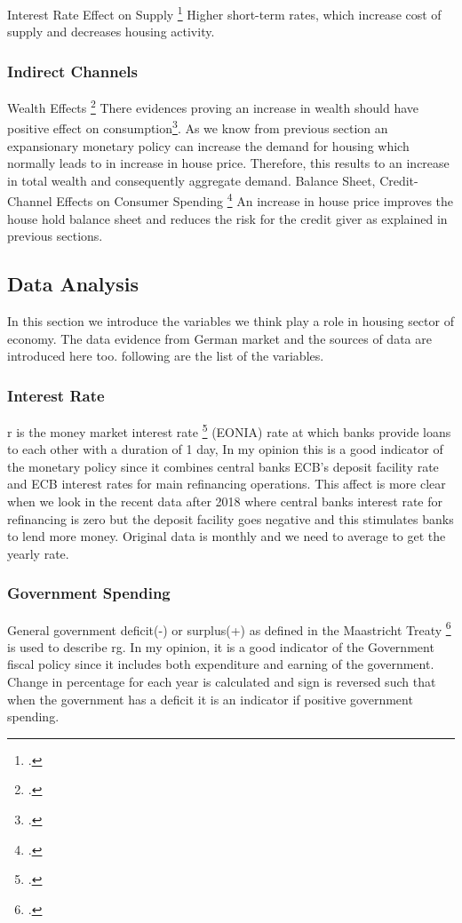 Interest Rate Effect on Supply \footcite[See.][]{Mishkin2007}
Higher short-term rates, which increase cost of supply and decreases housing activity.

\subsubsection{Indirect Channels}
Wealth Effects \footcite[See.][]{Mishkin2007}
There evidences proving an increase in wealth should have positive effect on consumption\footcite[See.][]{Mishkin2007}. As we know from previous section an expansionary monetary policy can increase the demand for housing which normally leads to in increase in house price. Therefore, this results to an increase in total wealth and consequently aggregate demand.
Balance Sheet, Credit-Channel Effects on Consumer Spending \footcite[See.][]{Mishkin2007}
An increase in house price improves the house hold balance sheet and reduces the risk for the credit giver as explained in previous sections.

\subsection{Data Analysis}\label{sec:Data}
In this section we introduce the variables we think play a role in housing sector of economy. The data evidence from German market and the sources of data are introduced here too. following are the list of the variables.
\subsubsection{Interest Rate} 
\ac{r} is the money market interest rate \footcite[See.][]{BundesBank} (EONIA) rate at which banks provide loans to each other with a duration of 1 day, In my opinion this is a good indicator of the monetary policy since it combines central banks ECB's deposit facility rate and ECB interest rates for main refinancing operations. This affect is more clear when we look in the recent data after 2018 where central banks interest rate for refinancing is zero but the deposit facility goes negative and this stimulates banks to lend more money. Original data is monthly and we need to average to get the yearly rate. 

\subsubsection{Government Spending} 
General government deficit(-) or surplus(+) as defined in the Maastricht Treaty \footcite[See.][]{BundesBank} is used to describe \ac{rg}. In my opinion, it is a good indicator of the Government fiscal policy since it includes both expenditure and earning of the government. Change in percentage for each year is calculated and sign is reversed such that when the government has a deficit it is an indicator if positive government spending.

